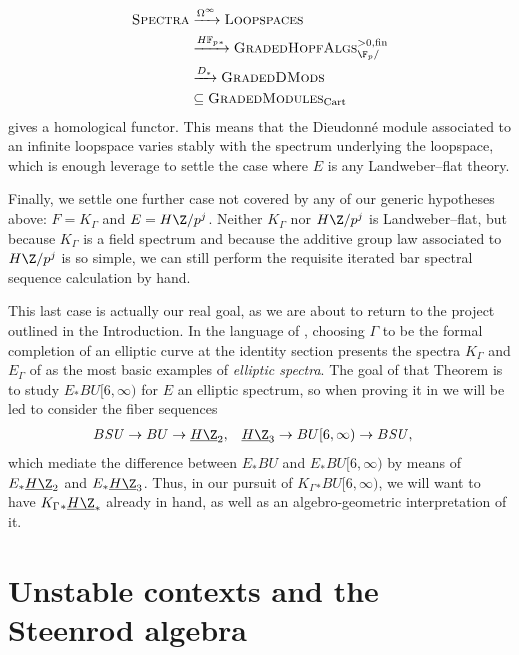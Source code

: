 \begin{description}
\begin{align*}
\CatOf{Spectra} & \xrightarrow{\Loops^\infty} \CatOf{Loopspaces} \\
& \xrightarrow{\HFp_*} \CatOf{GradedHopfAlgs}^{>0, \fin}_{\F_p/} \\
& \xrightarrow{D_*} \CatOf{GradedDMods} \\
& \subseteq \CatOf{GradedModules}_{\Cart}
\end{align*}
gives a homological functor.  This means that the Dieudonn\'e module associated to an infinite loopspace varies stably with the spectrum underlying the loopspace, which is enough leverage to settle the case where \(E\) is any Landweber--flat theory.
\item[{\Cref{CoopnsForMoravaKandHA}}] Finally, we settle one further case not covered by any of our generic hypotheses above: \(F = K_\Gamma\) and \(E = H\Z/p^j\).  Neither \(K_\Gamma\) nor \(H\Z/p^j\) is Landweber--flat, but because \(K_\Gamma\) is a field spectrum and because the additive group law associated to \(H\Z/p^j\) is so simple, we can still perform the requisite iterated bar spectral sequence calculation by hand.
\end{description}

This last case is actually our real goal, as we are about to return to the project outlined in the Introduction.  In the language of , choosing \(\Gamma\) to be the formal completion of an elliptic curve at the identity section presents the spectra \(K_\Gamma\) and \(E_\Gamma\) of  as the most basic examples of \textit{elliptic spectra}.  The goal of that Theorem is to study \(E_* BU[6, \infty)\) for \(E\) an elliptic spectrum, so when proving it in  we will be led to consider the fiber sequences
\begin{align*}
B\SU \to BU & \to \OS{H\Z}{2}, & \OS{H\Z}{3} \to BU[6, \infty) & \to B\SU,
\end{align*}
which mediate the difference between \(E_* BU\) and \(E_* BU[6, \infty)\) by means of \(E_* \OS{H\Z}{2}\) and \(E_* \OS{H\Z}{3}\).  Thus, in our pursuit of \(K_\Gamma{}_* BU[6, \infty)\), we will want to have \(K_\Gamma{}_* \OS{H\Z}{*}\) already in hand, as well as an algebro-geometric interpretation of it.









\section{Unstable contexts and the Steenrod algebra}\label{UnstableContextsSection}


